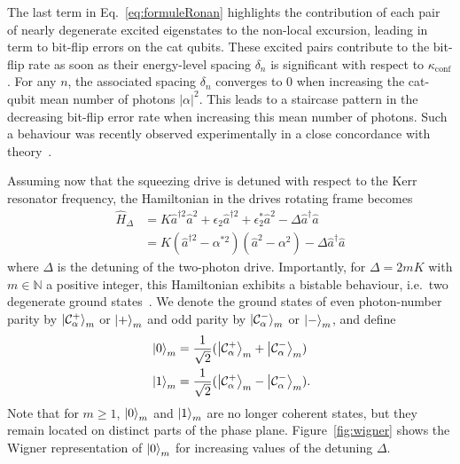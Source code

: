 \documentclass[%
 reprint,
 superscriptaddress,
 amsmath,
 amssymb,
 aps,
 pra,
 10pt
]{revtex4-2}
\newcommand{\ie}{i.e.}
\newcommand{\adag}{\hat{a}^\dagger}
\newcommand{\hata}{\hat{a}}
\begin{document}
The last term in Eq.~\eqref{eq:formuleRonan} highlights the contribution of each pair of nearly degenerate excited eigenstates to the non-local excursion, leading in term to bit-flip errors on the cat qubits. These excited pairs contribute to the bit-flip rate as soon as their energy-level spacing $\delta_n$ is significant with respect to $\kappa_{\text{conf}}$. For any $n$, the associated spacing $\delta_n$ converges to 0 when increasing the cat-qubit mean number of photons $|\alpha|^2$. This leads to a staircase pattern in the decreasing bit-flip error rate when increasing this mean number of photons. Such a behaviour was recently observed experimentally in a close concordance with theory~\cite{Frattini-2022}.  

Assuming now that the squeezing drive is detuned with respect to the Kerr resonator frequency, the  Hamiltonian in the drives rotating frame becomes 
\begin{equation}
    \begin{split}
        \hat{H}_\Delta &= K\hat{a}^{\dagger 2}\hat{a}^{ 2} + \epsilon_2 \hat{a}^{\dagger 2} + \epsilon_2^* \hat{a}^{2} - \Delta  \adag \hata \\
        &= K(\hat{a}^{\dagger 2} - \alpha^{*2})(\hat{a}^{ 2} - \alpha^2) - \Delta  \adag \hata
    \label{eq:DKerr}
    \end{split}
\end{equation}
where $\Delta$ is the detuning of the two-photon drive. Importantly, for $\Delta = 2mK$ with $m \in \mathbb{N}$ a positive integer, this Hamiltonian exhibits a bistable behaviour, \ie~two degenerate ground states~\cite{Roberts2019}. We denote the ground states of even photon-number parity by $\ket{\mathcal{C}_\alpha^+}_m$ or $\ket{+}_m$ and odd parity by $\ket{\mathcal{C}_\alpha^-}_m$ or $\ket{-}_m$, and define
\begin{equation}
    \begin{split}
        &\ket{0}_m=\frac{1}{\sqrt{2}}(\ket{\mathcal{C}_\alpha^+}_m+\ket{\mathcal{C}_\alpha^-}_m) \\
        &\ket{1}_m=\frac{1}{\sqrt{2}}(\ket{\mathcal{C}_\alpha^+}_m-\ket{\mathcal{C}_\alpha^-}_m).
        \label{newstates}
    \end{split}
\end{equation} 
Note that for $m \geq 1$, $\ket{0}_m$ and $\ket{1}_m$ are no longer coherent states, but they remain located on distinct parts of the phase plane. Figure~\ref{fig:wigner} shows the Wigner representation of $\ket{0}_m$ for increasing values of the detuning $\Delta$.
\end{document}
